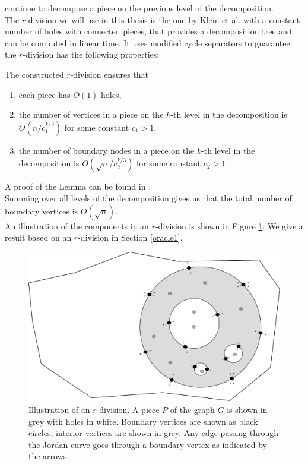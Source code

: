 continue to decompose a piece on the previous level of the decomposition.
\\
The $r$-division we will use in this thesis is the one by Klein et al.
\cite{klein2013structured} with a constant number of
holes with connected pieces, that provides a decomposition tree and can be computed in
linear time. It uses modified cycle separators to guarantee the $r$-division has the
following properties:
\begin{lemma}\label{rdivlemma}
  The constructed $r$-division ensures that
  \begin{enumerate}
    \item each piece has $O(1)$ holes,
    \item the number of vertices in a piece on the $k$-th level in the decomposition is
  $O(n/c_1^{k/3})$ for some constant $c_1>1$,
    \item the number of boundary nodes in a
  piece on the $k$-th level in the decomposition is $O(\sqrt{n}/c_2^{k/3})$ for some
  constant $c_2>1$.
  \end{enumerate}
\end{lemma}
\noindent A proof of the Lemma can be found in \cite{klein2013structured}. \\
Summing over all levels of the decomposition gives us that the total number of boundary
vertices is $O(\sqrt{n})$.\\
An illustration of the components in an $r$-division is shown in Figure \ref{rdiv}. We give
a result based on an $r$-division in Section \ref{oracle1}.

\begin{figure}[h!]
  \includegraphics[width=1.0\textwidth]{figs/rdiv.pdf}
  \caption{Illustration of an $r$-division. A piece $P$ of the graph $G$ is shown in
  grey with holes in white. Boundary vertices are shown as black circles, interior vertices are shown in
grey. Any edge passing through the Jordan curve goes through a boundary vertex as
indicated by the arrows.}
    \label{rdiv}
\end{figure}

